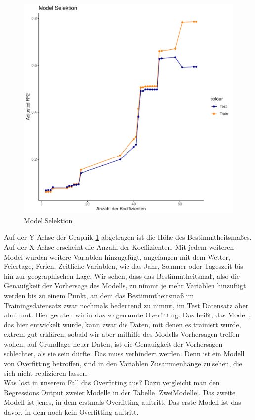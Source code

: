 \documentclass[a4paper,12pt]{thesis}
\begin{document}
\begin{figure}[]
	\centering
	\includegraphics[width=\textwidth]{Plots/ModelSelektion1.pdf}
	\caption{Model Selektion}
	\label{ModelSelektion}
\end{figure}

Auf der Y-Achse der Graphik \ref{ModelSelektion} abgetragen ist die Höhe des Bestimmtheitsmaßes. Auf der X Achse erscheint die Anzahl der Koeffizienten. Mit jedem weiteren Model wurden weitere Variablen hinzugefügt, angefangen mit dem Wetter, Feiertage, Ferien, Zeitliche Variablen, wie das Jahr, Sommer oder Tageszeit bis hin zur geographischen Lage. Wir sehen, dass das Bestimmtheitsmaß, also die Genauigkeit der Vorhersage des Modells, zu nimmt je mehr Variablen hinzufügt werden bis zu einem Punkt, an dem das Bestimmtheitsmaß im Trainingsdatensatz zwar nochmals bedeutend zu nimmt, im Test Datensatz aber abnimmt. Hier geraten wir in das so genannte Overfitting. Das heißt, das Modell, das hier entwickelt wurde, kann zwar die Daten, mit denen es trainiert wurde, extrem gut erklären, sobald wir aber mithilfe des Modells Vorhersagen treffen wollen, auf Grundlage neuer Daten, ist die Genauigkeit der Vorhersagen schlechter, als sie sein dürfte. Das muss verhindert werden. Denn ist ein Modell von Overfitting betroffen, sind in den Variablen Zusammenhänge zu sehen, die sich nicht replizieren lassen.\\
Was löst in unserem Fall das Overfitting aus? Dazu vergleicht man den Regressions Output zweier Modelle in der Tabelle \ref{ZweiModelle}. Das zweite Modell ist jenes, in dem erstmals Overfitting auftritt. Das erste Modell ist das davor, in dem noch kein Overfitting auftritt.
\end{document}
